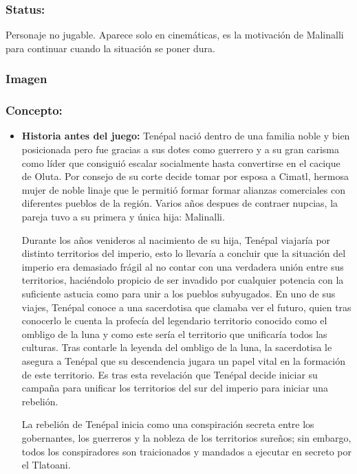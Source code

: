 \documentclass[11pt,letterpaper]{article}
\begin{document}
\subsubsection{Status:}
Personaje no jugable.
Aparece solo en cinemáticas, es la motivación de Malinalli para continuar cuando la situación se poner dura. 
\subsubsection{Imagen}
\subsubsection{Concepto:}
\begin{itemize}
	\item \textbf{Historia antes del juego:}
	Tenépal nació dentro de una familia noble y bien posicionada pero fue gracias a sus dotes como guerrero y a su gran carisma como líder que consiguió escalar socialmente hasta convertirse en el cacique de Oluta. Por consejo de su corte decide tomar por esposa a Cimatl, hermosa mujer de noble linaje que le permitió formar formar alianzas comerciales con diferentes pueblos de la región. Varios años despues de contraer nupcias, la pareja tuvo a su primera y única hija: Malinalli. 
	\\
	\par
	Durante los años venideros al nacimiento de su hija, Tenépal viajaría por distinto territorios del imperio, esto lo llevaría a concluir que la situación del imperio era demasiado frágil al no contar con una verdadera unión entre sus territorios, haciéndolo propicio de ser invadido por cualquier potencia con la suficiente astucia como para unir a los pueblos subyugados. En uno de sus viajes, Tenépal conoce a una sacerdotisa que clamaba ver el futuro, quien tras conocerlo le cuenta la profecía del legendario territorio conocido como el ombligo de la luna y como este sería el territorio que unificaría todos las culturas. Tras contarle la leyenda del ombligo de la luna, la sacerdotisa le asegura a Tenépal que su descendencia jugara un papel vital en la formación de este territorio. Es tras esta revelación que Tenépal decide iniciar su campaña para unificar los territorios del sur del imperio para iniciar una rebelión.
	\\
	\par
	La rebelión de Tenépal inicia como una conspiración secreta entre los gobernantes, los guerreros y la nobleza de los territorios sureños; sin embargo, todos los conspiradores son traicionados y mandados a ejecutar en secreto por el Tlatoani.  

\end{itemize}
\end{document}
